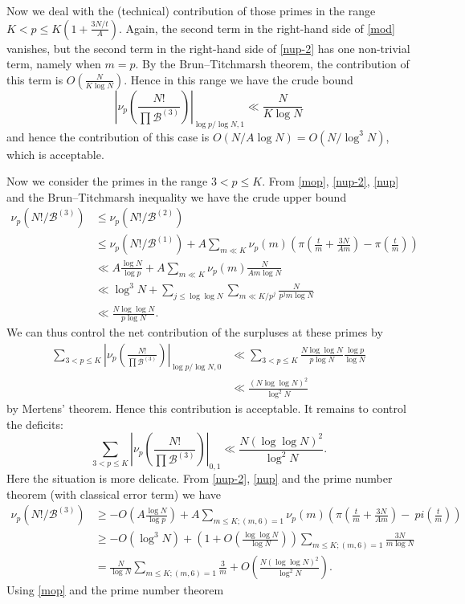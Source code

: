 \documentclass[12pt,a4paper,reqno]{amsart}
\numberwithin{equation}{section}
\theoremstyle{plain}
\theoremstyle{definition}
\newcommand\tuple{{\mathcal B}}
\begin{document}
Now we deal with the (technical) contribution of those primes in the range $K < p \leq K(1+\frac{3N/t}{A})$.  Again, the second term in the right-hand side of \eqref{mod} vanishes, but the second term in the right-hand side of \eqref{nup-2} has one non-trivial term, namely when $m=p$.  By the Brun--Titchmarsh theorem, the contribution of this term is $O(\frac{N}{K \log N})$.  Hence in this range we have the crude bound
$$
\left|\nu_p\left(\frac{N!}{\prod \tuple^{(3)}}\right)\right|_{\log p/\log N,1}
\ll \frac{N}{K \log N} $$
and hence the contribution of this case is $O(N/A \log N) = O(N/\log^3 N)$, which is acceptable.

Now we consider the primes in the range $3 < p \leq K$.  From \eqref{mop}, \eqref{nup-2}, \eqref{nup} and the Brun--Titchmarsh inequality we have the crude  upper bound
\begin{align*}
\nu_p(N!/\tuple^{(3)}) &\leq
\nu_p(N!/\tuple^{(2)})  \\
&\leq \nu_p(N!/\tuple^{(1)}) + A \sum_{m \ll K} \nu_p(m) \left(\pi\left(\frac{t}{m}+\frac{3N}{Am}\right) - \pi\left(\frac{t}{m}\right)\right) \\
&\ll A \frac{\log N}{\log p} + A \sum_{m \ll K} \nu_p(m) \frac{N}{Am \log N} \\
&\ll \log^3 N + \sum_{j \leq \log\log N} \sum_{m \ll K/p^j} \frac{N}{p^j m \log N} \\
&\ll \frac{N \log\log N}{p \log N}.
\end{align*}
We can thus control the net contribution of the surpluses at these primes by
\begin{align*}
  \sum_{3 < p \leq K} \left|\nu_p\left(\frac{N!}{\prod \tuple^{(3)}}\right)\right|_{\log p/\log N,0} &\ll \sum_{3 < p \leq K}
  \frac{N \log\log N}{p \log N} \frac{\log p}{\log N} \\
  &\ll \frac{(N \log\log N)^2}{\log^2 N}
\end{align*}
by Mertens' theorem.  Hence this contribution is acceptable.  It remains to control the deficits:
$$
\sum_{3 < p \leq K} \left|\nu_p\left(\frac{N!}{\prod \tuple^{(3)}}\right)\right|_{0, 1} \ll \frac{N (\log\log N)^2}{\log^2 N}.$$
Here the situation is more delicate.  From \eqref{nup-2}, \eqref{nup} and the prime number theorem (with classical error term) we have
\begin{align*}
  \nu_p(N!/\tuple^{(3)}) &\geq
-O( A \frac{\log N}{\log p}) + A \sum_{m \leq K; (m,6)=1} \nu_p(m) \left(\pi\left(\frac{t}{m}+\frac{3N}{Am}\right) - \
pi\left(\frac{t}{m}\right)\right) \\
&\geq -O(\log^3 N) + \left(1 + O\left(\frac{\log \log N}{\log N}\right)\right) \sum_{m \leq K; (m,6)=1} \frac{3N}{m \log N} \\ 
&= \frac{N}{\log N} \sum_{m \leq K; (m,6)=1} \frac{3}{m} + O\left( \frac{N(\log\log N)^2}{\log^2 N} \right).
\end{align*}
Using \eqref{mop} and the prime number theorem
\end{document}

